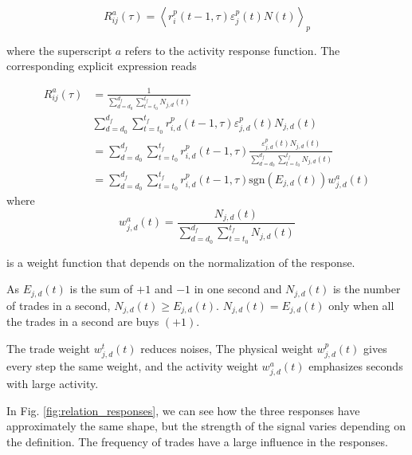 \begin{equation}\label{eq:activity_response_functions_general}
    R^{a}_{ij}\left(\tau\right)=\left\langle r^{p}_{i}\left(t-1, \tau\right)
    \varepsilon_{j}^{p} \left(t\right) N \left(t \right)
    \right\rangle _{p}
\end{equation}

where the superscript $a$ refers to the activity response function. The
corresponding explicit expression reads

\begin{align}
    R_{ij}^{a}\left(\tau\right)&=\frac{1}{\sum_{d=d_{0}}^{d_{f}}
    \sum_{t=t_{0}}^{t_{f}}N_{j,d} \left(t\right)} \nonumber \\
    &\sum_{d=d_{0}}^{d_{f}}\sum_{t=t_{0}}^{t_{f}}r^{p}_{i,d}
    \left(t-1,\tau\right) \varepsilon_{j,d}^{p}\left(t\right) N_{j,d}
    \left(t\right)\\
    &=\sum_{d=d_{0}}^{d_{f}} \sum_{t=t_{0}}^{t_{f}}r^{p}_{i,d}
    \left(t-1,\tau\right) \frac{\varepsilon_{j,d}^{p}\left(t \right)
    N_{j,d}\left(t\right)} {\sum_{d=d_{0}}^{d_{f}}\sum_{t=t_{0}}^{t_{f}}
    N_{j,d}\left(t \right)} \nonumber \\
    &=\sum_{d=d_{0}}^{d_{f}} \sum_{t=t_{0}}^{t_{f}}r^{p}_{i,d}
    \left(t-1,\tau\right) \text{sgn}\left(E_{j,d}\left(t\right)\right)
    w_{j,d}^{a}\left(t\right)
\end{align}
where
\begin{equation}
    w_{j,d}^{a}\left(t\right) = \frac{N_{j,d}\left(t \right)}
    {\sum_{d=d_{0}}^{d_{f}}\sum_{t=t_{0}}^{t_{f}}N_{j,d}\left(t\right)}
\end{equation}

is a weight function that depends on the normalization of the response.

As $E_{j,d}\left(t\right)$ is the sum of $+1$ and $-1$ in one second and
$N_{j,d}\left(t\right)$ is the number of trades in a second,
$N_{j,d}\left(t\right) \ge E_{j,d}\left(t\right)$.
$N_{j,d}\left(t\right) = E_{j,d}\left(t\right)$ only when all the trades in a
second are buys $(+1)$.

The trade weight $w_{j,d}^{t}\left(t\right)$ reduces noises, The physical
weight $w_{j,d}^{p}\left(t\right)$ gives every step the same weight, and the
activity weight $w_{j,d}^{a}\left(t\right)$ emphasizes seconds with large
activity.

In Fig. \ref{fig:relation_responses}, we can see how the three
responses have approximately the same shape, but the strength of the signal
varies depending on the definition. The frequency of trades have a large
influence in the responses.

